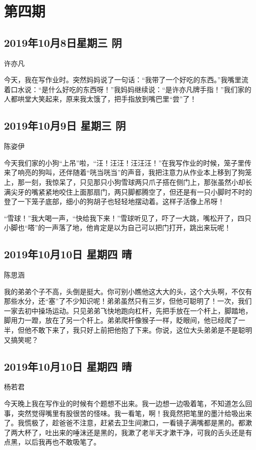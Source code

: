 \chapter{第四期}

\section{2019年10月8日星期三 阴}

许亦凡

今天，我在写作业时。突然妈妈说了一句话：``我带了一个好吃的东西。''我嘴里流着口水说：``是什么好吃的东西呀！''我妈妈继续说：``是许亦凡牌手指！''我们家的人都哄堂大笑起来，原来我太饿了，把手指放到嘴巴里``尝''了！

\section{2019年10月9日 星期三 阴}

陈姿伊

今天我们家的小狗``上吊''啦，``汪！汪汪！汪汪汪！''在我写作业的时候，笼子里传来了响亮的狗叫，还伴随着``咣当咣当''的声音，我把注意力从作业本上移到了狗笼上，那一刻，我惊呆了，只见那只小狗雪球两只爪子搭在侧门上，那张虽然小却长满尖牙的嘴紧紧地咬住上面那扇门，两只脚都腾空了，但还是有一只小脚时不时的登了一下笼子底部，细小的狗胡子也轻轻地摆动着。这样子活像上吊呀！

``雪球！''我大喝一声，``快给我下来！''雪球听见了，吓了一大跳，嘴松开了，四只小脚也``嗒''的一声落了地，他肯定是以为自己可以把门打开，跳出来玩呢！

\section{2019年10月10日 星期四 晴}

陈思涵

我的弟弟个子不高，头倒是挺大。你可别小瞧他这大大的头，这个大头啊，不仅有那些水分，还``塞''了不少知识呢！弟弟虽然只有三岁，但他可聪明了！一次，我们一家去初中操场运动。只见弟弟飞快地跑向杠杆，先把手放在一个杆上，脚踏地，脚用力一蹬，放在了另一个杆上。弟弟爬杆像猴子一样，眨眼间，他已经爬了一半，但他不敢下来了，我只好上前把他抱了下来。你说，这位大头弟弟是不是聪明又搞笑呢？

\section{2019年10月10日 星期四 晴}

杨若君

今天晚上我在写作业的时候有个题想不出来。我一边想一边吸着笔，不知道怎么回事，突然觉得嘴里有股很苦的怪味。我一看笔，啊！我竟然把笔里的墨汁给吸出来了。我慌极了，趁爸爸不注意，赶紧去卫生间漱口，一看镜子满嘴都是黑的。都漱了两大杯了，吐出来的唾沫还是黑的，我漱了老半天才漱干净，可我的舌头还是有点黑，以后我再也不敢吸笔了。

